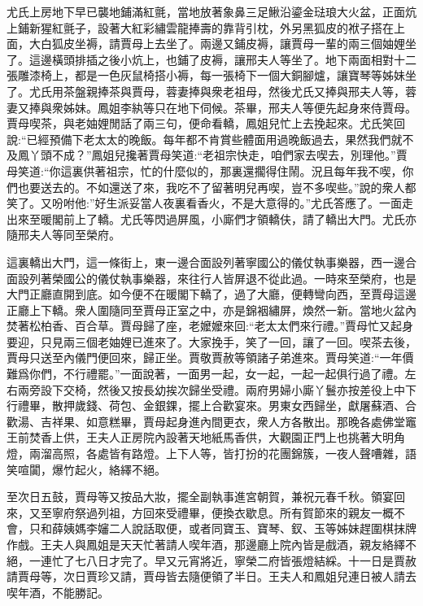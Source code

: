 \begin{parag}
    尤氏上房地下早已襲地鋪滿紅氈，當地放著象鼻三足鰍沿鎏金琺琅大火盆，正面炕上鋪新猩紅氈子，設著大紅彩繡雲龍捧壽的靠背引枕，外另黑狐皮的袱子搭在上面，大白狐皮坐褥，請賈母上去坐了。兩邊又鋪皮褥，讓賈母一輩的兩三個妯娌坐了。這邊橫頭排插之後小炕上，也鋪了皮褥，讓邢夫人等坐了。地下兩面相對十二張雕漆椅上，都是一色灰鼠椅搭小褥，每一張椅下一個大銅腳爐，讓寶琴等姊妹坐了。尤氏用茶盤親捧茶與賈母，蓉妻捧與衆老祖母，然後尤氏又捧與邢夫人等，蓉妻又捧與衆姊妹。鳳姐李紈等只在地下伺候。茶畢，邢夫人等便先起身來侍賈母。賈母喫茶，與老妯娌閒話了兩三句，便命看轎，鳳姐兒忙上去挽起來。尤氏笑回說:“已經預備下老太太的晚飯。每年都不肯賞些體面用過晚飯過去，果然我們就不及鳳丫頭不成？”鳳姐兒攙著賈母笑道:“老祖宗快走，咱們家去喫去，別理他。”賈母笑道:“你這裏供著祖宗，忙的什麼似的，那裏還擱得住鬧。況且每年我不喫，你們也要送去的。不如還送了來，我吃不了留著明兒再喫，豈不多喫些。”說的衆人都笑了。又吩咐他:”好生派妥當人夜裏看香火，不是大意得的。”尤氏答應了。一面走出來至暖閣前上了轎。尤氏等閃過屏風，小廝們才領轎伕，請了轎出大門。尤氏亦隨邢夫人等同至榮府。
\end{parag}


\begin{parag}
    這裏轎出大門，這一條街上，東一邊合面設列著寧國公的儀仗執事樂器，西一邊合面設列著榮國公的儀仗執事樂器，來往行人皆屏退不從此過。一時來至榮府，也是大門正廳直開到底。如今便不在暖閣下轎了，過了大廳，便轉彎向西，至賈母這邊正廳上下轎。衆人圍隨同至賈母正室之中，亦是錦裀繡屏，煥然一新。當地火盆內焚著松柏香、百合草。賈母歸了座，老嬤嬤來回:“老太太們來行禮。”賈母忙又起身要迎，只見兩三個老妯娌已進來了。大家挽手，笑了一回，讓了一回。喫茶去後，賈母只送至內儀門便回來，歸正坐。賈敬賈赦等領諸子弟進來。賈母笑道:“一年價難爲你們，不行禮罷。”一面說著，一面男一起，女一起，一起一起俱行過了禮。左右兩旁設下交椅，然後又按長幼挨次歸坐受禮。兩府男婦小廝丫鬟亦按差役上中下行禮畢，散押歲錢、荷包、金銀錁，擺上合歡宴來。男東女西歸坐，獻屠蘇酒、合歡湯、吉祥果、如意糕畢，賈母起身進內間更衣，衆人方各散出。那晚各處佛堂竈王前焚香上供，王夫人正房院內設著天地紙馬香供，大觀園正門上也挑著大明角燈，兩溜高照，各處皆有路燈。上下人等，皆打扮的花團錦簇，一夜人聲嘈雜，語笑喧闐，爆竹起火，絡繹不絕。
\end{parag}


\begin{parag}
    至次日五鼓，賈母等又按品大妝，擺全副執事進宮朝賀，兼祝元春千秋。領宴回來，又至寧府祭過列祖，方回來受禮畢，便換衣歇息。所有賀節來的親友一概不會，只和薛姨媽李嬸二人說話取便，或者同寶玉、寶琴、釵、玉等姊妹趕圍棋抹牌作戲。王夫人與鳳姐是天天忙著請人喫年酒，那邊廳上院內皆是戲酒，親友絡繹不絕，一連忙了七八日才完了。早又元宵將近，寧榮二府皆張燈結綵。十一日是賈赦請賈母等，次日賈珍又請，賈母皆去隨便領了半日。王夫人和鳳姐兒連日被人請去喫年酒，不能勝記。
\end{parag}


